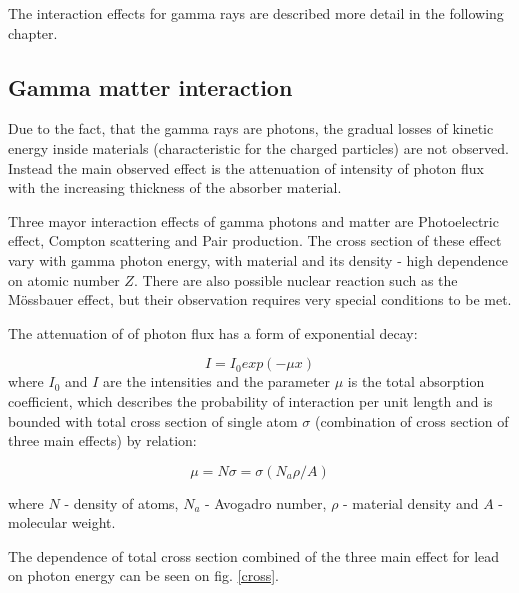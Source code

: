 \par

The interaction effects for gamma rays are described more detail in the following chapter.



\subsection{Gamma matter interaction}

Due to the fact, that the gamma rays are photons, the gradual losses of kinetic energy inside materials (characteristic for the charged particles) are not observed. Instead the main observed effect is the attenuation of intensity of photon flux with the increasing thickness of the absorber material. 

\par
Three mayor interaction effects of gamma photons and matter are Photoelectric effect, Compton scattering and Pair production. The cross section of these effect vary with gamma photon energy, with material and its density - high dependence on atomic number $Z$. There are also possible nuclear reaction such as the Mössbauer effect, but their observation requires very special conditions to be met.


\par
The attenuation of of photon flux has a form of exponential decay:

\begin{equation}
 I = I_{0}exp(-\mu x)
 \end{equation}
where $I_{0}$ and $I$ are the intensities and the parameter $\mu$ is the total absorption coefficient, which describes the probability of interaction per unit length and is bounded with total cross section of single atom $\sigma$ (combination of cross section of three main effects) by relation:

\begin{equation}
 \mu = N \sigma = \sigma(N_{a}\rho/A)
 \end{equation}
 
where $N$ - density of atoms, $N_{a}$ - Avogadro number, $\rho$ - material density and $A$ - molecular weight.

\par
The dependence of total cross section combined of the three main effect for lead on photon energy can be seen on fig. \ref{cross}.

